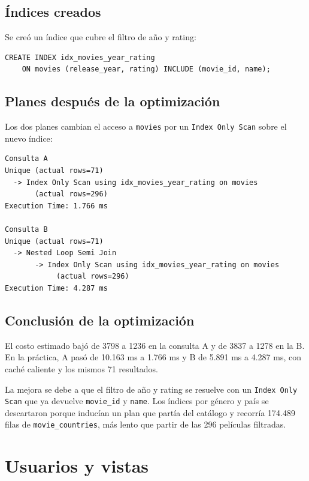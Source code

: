 \documentclass[11pt,a4paper]{article}
\begin{document}
\subsection{Índices creados}

Se creó un índice que cubre el filtro de año y rating:

\begin{verbatim}
CREATE INDEX idx_movies_year_rating
    ON movies (release_year, rating) INCLUDE (movie_id, name);
\end{verbatim}

\subsection{Planes después de la optimización}

Los dos planes cambian el acceso a \texttt{movies} por un \texttt{Index Only
Scan} sobre el nuevo índice:

\begin{verbatim}
Consulta A
Unique (actual rows=71)
  -> Index Only Scan using idx_movies_year_rating on movies
       (actual rows=296)
Execution Time: 1.766 ms

Consulta B
Unique (actual rows=71)
  -> Nested Loop Semi Join
       -> Index Only Scan using idx_movies_year_rating on movies
            (actual rows=296)
Execution Time: 4.287 ms
\end{verbatim}

\subsection{Conclusión de la optimización}

El costo estimado bajó de 3798 a 1236 en la consulta A y de 3837 a 1278 en la
B. En la práctica, A pasó de 10.163 ms a 1.766 ms y B de 5.891 ms a 4.287 ms,
con caché caliente y los mismos 71 resultados.

La mejora se debe a que el filtro de año y rating se resuelve con un
\texttt{Index Only Scan} que ya devuelve \texttt{movie\_id} y \texttt{name}.
Los índices por género y país se descartaron porque inducían un plan que partía
del catálogo y recorría 174.489 filas de \texttt{movie\_countries}, más lento
que partir de las 296 películas filtradas.

\section{Usuarios y vistas}
\end{document}
